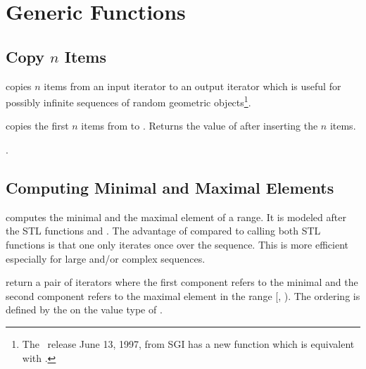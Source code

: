 \section{Generic Functions}
\label{sectionGenericFunctions}

\subsection{Copy $n$ Items}
\label{sectionCopyN}

 copies $n$ items from an input iterator to an
output iterator which is useful for possibly infinite sequences of 
random geometric objects\footnote{%
  The \stl\ release June 13, 1997, from SGI has a new function
   which is equivalent with .}.


{copies the first $n$ items from  to .
    Returns the value of  after inserting the $n$ items.}

\ccSeeAlso

.

\subsection{Computing Minimal and Maximal Elements}
\label{sectionMinmaxelement}

 computes the minimal and the maximal element of a
range. It is modeled after the STL functions  and
. The advantage of  compared to calling
both STL functions is that one only iterates once over the sequence. This is
more efficient especially for large and/or complex sequences.


 {return a pair of iterators where the first component refers to the
  minimal and the second component refers to the maximal element in the range
  [, ). The ordering is defined by the  on
  the value type of .}

